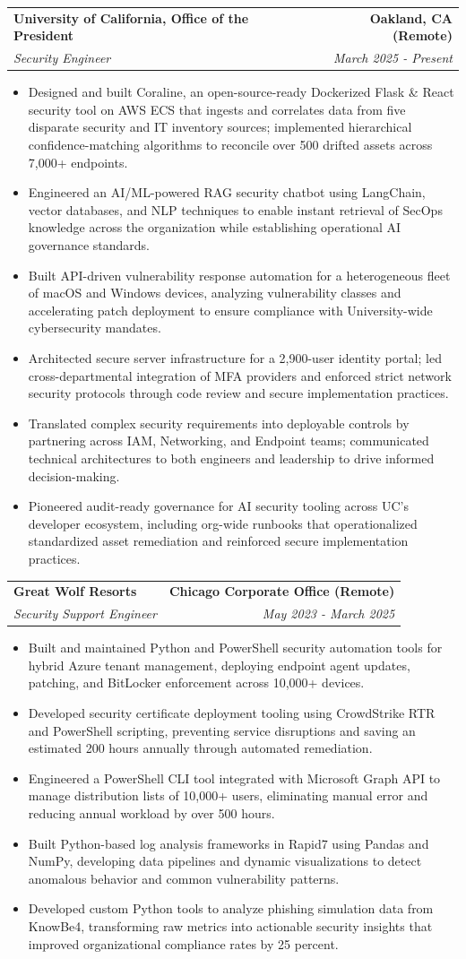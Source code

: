 \documentclass[letterpaper,10pt]{article}
\makeatletter
\newcommand{\resumeItem}[1]{\item{\small #1}}
\newcommand{\resumeItemListStart}{\begin{itemize}}
\newcommand{\resumeItemListEnd}{\end{itemize}\vspace{-2pt}}
\newcommand{\resumeSubheading}[4]{%
  \vspace{-2pt}\item
  \begin{tabular*}{\textwidth}[t]{l@{\extracolsep{\fill}}r}
    \textbf{\large #1} & \textbf{\small #2} \\
    \textit{\large #3} & \textit{\small #4} \\
  \end{tabular*}\vspace{-2pt}
}
\makeatother
\begin{document}
\resumeSubheading
  {University of California, Office of the President}{Oakland, CA (Remote)}
  {Security Engineer}{March 2025 - Present}
  \vspace{2pt}
\resumeItemListStart
  \resumeItem{Designed and built Coraline, an open-source-ready Dockerized Flask \& React security tool on AWS ECS that ingests and correlates data from five disparate security and IT inventory sources; implemented hierarchical confidence-matching algorithms to reconcile over 500 drifted assets across 7,000+ endpoints.}
  \resumeItem{Engineered an AI/ML-powered RAG security chatbot using LangChain, vector databases, and NLP techniques to enable instant retrieval of SecOps knowledge across the organization while establishing operational AI governance standards.}
  \resumeItem{Built API-driven vulnerability response automation for a heterogeneous fleet of macOS and Windows devices, analyzing vulnerability classes and accelerating patch deployment to ensure compliance with University-wide cybersecurity mandates.}
  \resumeItem{Architected secure server infrastructure for a 2,900-user identity portal; led cross-departmental integration of MFA providers and enforced strict network security protocols through code review and secure implementation practices.}
  \resumeItem{Translated complex security requirements into deployable controls by partnering across IAM, Networking, and Endpoint teams; communicated technical architectures to both engineers and leadership to drive informed decision-making.}
  \resumeItem{Pioneered audit-ready governance for AI security tooling across UC’s developer ecosystem, including org-wide runbooks that operationalized standardized asset remediation and reinforced secure implementation practices.}
  \resumeItemListEnd
\vspace{6pt}

\resumeSubheading
  {Great Wolf Resorts}{Chicago Corporate Office (Remote)}
  {Security Support Engineer}{May 2023 - March 2025}
\vspace{2pt}
\resumeItemListStart
  \resumeItem{Built and maintained Python and PowerShell security automation tools for hybrid Azure tenant management, deploying endpoint agent updates, patching, and BitLocker enforcement across 10,000+ devices.}
  \resumeItem{Developed security certificate deployment tooling using CrowdStrike RTR and PowerShell scripting, preventing service disruptions and saving an estimated 200 hours annually through automated remediation.}
  \resumeItem{Engineered a PowerShell CLI tool integrated with Microsoft Graph API to manage distribution lists of 10,000+ users, eliminating manual error and reducing annual workload by over 500 hours.}
  \resumeItem{Built Python-based log analysis frameworks in Rapid7 using Pandas and NumPy, developing data pipelines and dynamic visualizations to detect anomalous behavior and common vulnerability patterns.}
  \resumeItem{Developed custom Python tools to analyze phishing simulation data from KnowBe4, transforming raw metrics into actionable security insights that improved organizational compliance rates by 25 percent.}
\resumeItemListEnd
\vspace{6pt}
\end{document}
